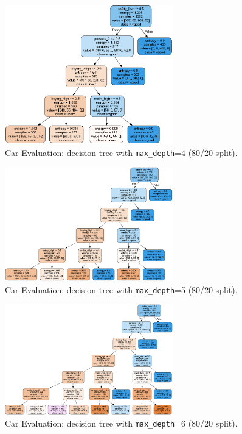 \begin{figure}[H]
	\centering
	\includegraphics[width=0.65\textwidth]{imgs/dt-mini/dt__car_evaluation__80_vs_20__4.png}
	\caption{Car Evaluation: decision tree with \texttt{max\_depth}=4 (80/20 split).}\label{fig:ce-dt-depth-4}
\end{figure}

\begin{figure}[H]
	\centering
	\includegraphics[width=0.65\textwidth]{imgs/dt-mini/dt__car_evaluation__80_vs_20__5.png}
	\caption{Car Evaluation: decision tree with \texttt{max\_depth}=5 (80/20 split).}\label{fig:ce-dt-depth-5}
\end{figure}

\begin{figure}[H]
	\centering
	\includegraphics[width=0.65\textwidth]{imgs/dt-mini/dt__car_evaluation__80_vs_20__6.png}
	\caption{Car Evaluation: decision tree with \texttt{max\_depth}=6 (80/20 split).}\label{fig:ce-dt-depth-6}
\end{figure}

